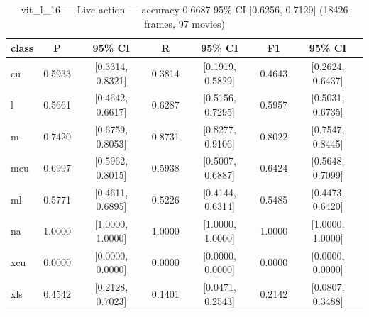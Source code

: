 \begin{table}[htbp]
\centering
\caption{vit\_l\_16 — Live-action — accuracy 0.6687 95\% CI [0.6256, 0.7129] (18426 frames, 97 movies)}
\label{tab:vit-l-16-live-action}
\begin{tabular}{lcccccc}
\toprule
class & P & 95\% CI & R & 95\% CI & F1 & 95\% CI \\
\midrule
cu & 0.5933 & [0.3314, 0.8321] & 0.3814 & [0.1919, 0.5829] & 0.4643 & [0.2624, 0.6437] \\
l & 0.5661 & [0.4642, 0.6617] & 0.6287 & [0.5156, 0.7295] & 0.5957 & [0.5031, 0.6735] \\
m & 0.7420 & [0.6759, 0.8053] & 0.8731 & [0.8277, 0.9106] & 0.8022 & [0.7547, 0.8445] \\
mcu & 0.6997 & [0.5962, 0.8015] & 0.5938 & [0.5007, 0.6887] & 0.6424 & [0.5648, 0.7099] \\
ml & 0.5771 & [0.4611, 0.6895] & 0.5226 & [0.4144, 0.6314] & 0.5485 & [0.4473, 0.6420] \\
na & 1.0000 & [1.0000, 1.0000] & 1.0000 & [1.0000, 1.0000] & 1.0000 & [1.0000, 1.0000] \\
xcu & 0.0000 & [0.0000, 0.0000] & 0.0000 & [0.0000, 0.0000] & 0.0000 & [0.0000, 0.0000] \\
xls & 0.4542 & [0.2128, 0.7023] & 0.1401 & [0.0471, 0.2543] & 0.2142 & [0.0807, 0.3488] \\
\bottomrule
\end{tabular}
\end{table}

